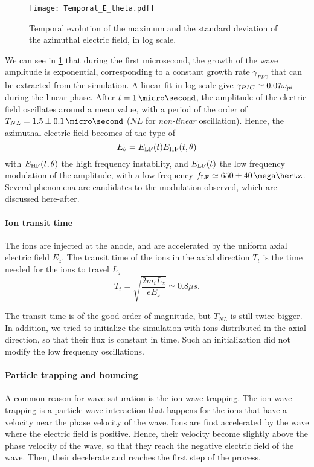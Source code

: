   \begin{figure}[!hbt]
    \centering
    \texttt{[image: Temporal\_E\_theta.pdf]}
    \caption{Temporal evolution of the maximum and the standard deviation of the azimuthal electric field, in log scale.}
    \label{fig-Ezstd_time}
  \end{figure}
  
  We can see in \cref{fig-Ezstd_time} that during the first microsecond, the growth of the wave amplitude is exponential, corresponding to a constant growth rate $\gamma_{PIC}$ that can be extracted from the simulation.
  A linear fit in log scale give $\gamma_{PIC} \simeq 0.07 \omega_{pi}$ during the linear phase.
  After $t=1\,\micro\second$, the amplitude of the electric field oscillates around a mean value, with a period of the order of $T_{NL}=1.5 \pm 0.1 \,\micro\second$ ($NL$ for {\it non-linear} oscillation).
  Hence, the azimuthal electric field becomes of the type of
  \[  E_{\theta} = E_{\rm LF}(t) E_{\rm HF}(t, {\theta}) \]
  with $E_{\rm HF}(t, \theta) $ the high frequency instability, and $E_{\rm LF}(t)$ the low frequency modulation of the amplitude, with a low frequency $f_{\rm LF} \simeq  650 \pm 40 \,\mega\hertz$.
  Several phenomena are candidates to the modulation observed, which are discussed here-after.
  
  
  \paragraph{Ion transit time\\}
    The ions are injected at the anode, and are accelerated by the uniform axial electric field $E_z$.
    The transit time of the ions in the axial direction $T_t$  is the time needed for the ions to travel $L_z$
    \begin{equation} \label{eq-transittime}
      T_{t} = \sqrt{\frac{2 m_i L_z}{e E_z}} \simeq 0.8 \mu s.
    \end{equation}
    
    The transit time is of the good  order of magnitude, but $T_{NL}$ is still twice bigger.
    In addition, we tried to initialize the simulation with ions distributed in the axial direction, so that their flux is constant in time.
    Such an initialization did not modify the low frequency oscillations.
    
  \paragraph{Particle trapping and bouncing\\}
    A common reason for wave saturation is the ion-wave trapping.
    The ion-wave trapping is a particle wave interaction that happens for the ions that have a velocity near the phase velocity of the wave.
    Ions are first accelerated by the wave where the electric field is positive.
    Hence, their velocity become slightly above the phase velocity of the wave, so that they reach the negative electric field of the wave.
    Then, their decelerate and reaches the first step of the process. 
    
